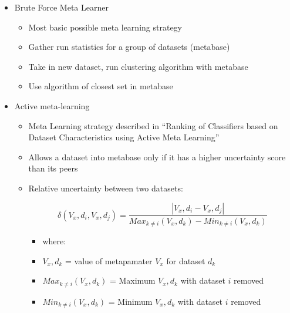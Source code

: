 \documentclass{beamer}
\begin{document}
\begin{frame}[t]
  \begin{itemize}
  \item Brute Force Meta Learner
    \begin{itemize}
       \item Most basic possible meta learning strategy
       \item Gather run statistics for a group of datasets (metabase)
       \item Take in new dataset, run clustering algorithm with metabase
       \item Use algorithm of closest set in metabase
    \end{itemize}
  \item Active meta-learning
    \begin{itemize}
       \item Meta Learning strategy described in ``Ranking of Classifiers
             based on Dataset Characteristics using Active Meta Learning''
       \item Allows a dataset into metabase only if it has a higher uncertainty
         score than its peers
       \item Relative uncertainty between two datasets:

         $$\delta(V_x,d_i,V_x,d_j) = \frac{|V_x,d_i - V_x,d_j|}{Max_{k\neq i}(V_x,d_k)- Min_{k\neq i}(V_x,d_k)}$$
          \begin{itemize}
             \item where:
             \item $V_x,d_k$ = value of metapamater $V_x$ for dataset $d_k$
             \item $Max_{k\neq i}(V_x,d_k)$ = Maximum $V_x,d_k$ with dataset $i$
                   removed
             \item $Min_{k\neq i}(V_x,d_k)$ = Minimum $V_x,d_k$ with dataset $i$
                   removed
          \end{itemize}

    \end{itemize}
  \end{itemize}
\end{frame}
\end{document}
